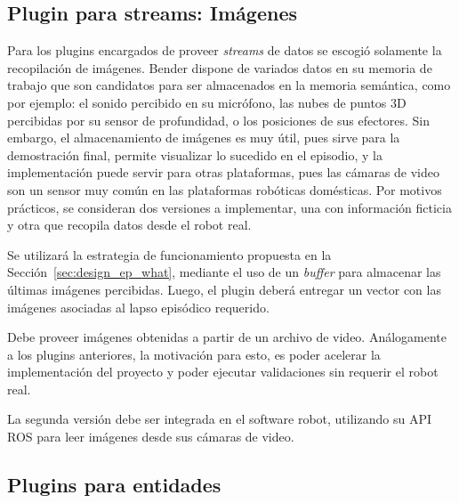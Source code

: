 \subsection{Plugin para streams: Imágenes}

Para los plugins encargados de proveer \textit{streams} de datos se escogió solamente la recopilación de imágenes. Bender dispone de variados datos en su memoria de trabajo que son candidatos para ser almacenados en la memoria semántica, como por ejemplo: el sonido percibido en su micrófono, las nubes de puntos 3D percibidas por su sensor de profundidad, o los posiciones de sus efectores. Sin embargo, el almacenamiento de imágenes es muy útil, pues sirve para la demostración final, permite visualizar lo sucedido en el episodio, y la implementación puede servir para otras plataformas, pues las cámaras de video son un sensor muy común en las plataformas robóticas domésticas. Por motivos prácticos, se consideran dos versiones a implementar, una con información ficticia y otra que recopila datos desde el robot real.

Se utilizará la estrategia de funcionamiento propuesta en la Sección~\ref{sec:design_ep_what}, mediante el uso de un \textit{buffer} para almacenar las últimas imágenes percibidas. Luego, el plugin deberá entregar un vector con las imágenes asociadas al lapso episódico requerido.

Debe proveer imágenes obtenidas a partir de un archivo de video. Análogamente a los plugins anteriores, la motivación para esto, es poder acelerar la implementación del proyecto y poder ejecutar validaciones sin requerir el robot real.

La segunda versión debe ser integrada en el software robot, utilizando su API ROS para leer imágenes desde sus cámaras de video.

\subsection{Plugins para entidades}

